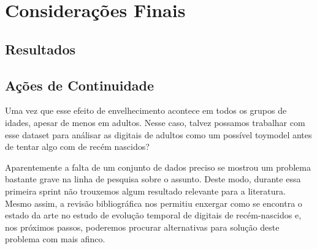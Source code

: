 \documentclass[12pt,a4paper]{article}
\begin{document}
\section{Considerações Finais}
\subsection{Resultados}
\subsection{Ações de Continuidade}
Uma vez que esse efeito de envelhecimento acontece em todos os grupos de idades, apesar de menos em adultos. Nesse caso, talvez possamos trabalhar com esse dataset para análisar as digitais de adultos como um possível toymodel antes de tentar algo com de recém nascidos?

Aparentemente a falta de um conjunto de dados preciso se mostrou um problema bastante grave na linha de pesquisa sobre o assunto. Deste modo, durante essa primeira sprint não trouxemos algum resultado relevante para a literatura. Mesmo assim, a revisão bibliográfica nos permitiu enxergar como se encontra o estado da arte no estudo de evolução temporal de digitais de recém-nascidos e, nos próximos passos, poderemos procurar alternativas para solução deste problema com mais afinco.
\end{document}
